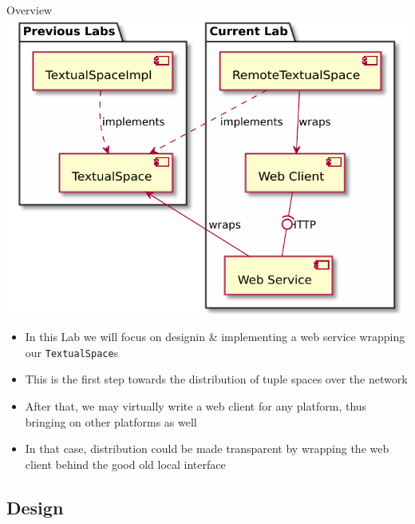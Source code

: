 \documentclass[presentation]{beamer}\mode<presentation>{\usetheme{AMSCesenaPurpleAndGold}}
\begin{document}
\begin{frame}[allowframebreaks]{Overview}
    \centering
    \includegraphics[height=.8\textheight]{img/whole-picture.pdf}

    \bigskip

    \begin{itemize}
        \item In this Lab we will focus on designin \& implementing a \alert{web service} wrapping our \texttt{TextualSpace}s

        \bigskip

        \item This is the first step towards the \alert{distribution} of \linda{} tuple spaces over the network

        \bigskip

        \item After that, we may virtually write a \alert{web client} for any platform, thus bringing \linda{} on other platforms as well

        \bigskip

        \item In that case, distribution could be made \alert{transparent} by wrapping the web client behind the good old local interface
    \end{itemize}
\end{frame}

\subsection{Design}
\end{document}
